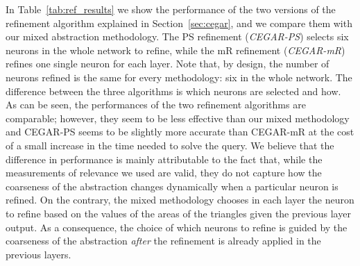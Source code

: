 In Table~\ref{tab:ref_results} we show the performance of the two versions of the
refinement algorithm explained in Section~\ref{sec:cegar}, and we compare them 
with our mixed abstraction methodology. The PS refinement (\textit{CEGAR-PS}) 
selects six neurons in the whole network to refine, while the mR refinement 
(\textit{CEGAR-mR}) refines one single neuron for each layer.
Note that, by design, the number of neurons refined is the same for every 
methodology: six in the whole network. The difference between the three algorithms 
is which neurons are selected and how. As can be seen, the performances of the 
two refinement algorithms are comparable; however, they seem to be less effective 
than our mixed methodology and CEGAR-PS seems to be slightly more accurate than 
CEGAR-mR at the cost of a small increase in the time needed to solve the query.
We believe that the difference in performance is mainly attributable to the fact 
that, while the measurements of relevance we used are valid, they do not capture how 
the coarseness of the abstraction changes dynamically when a particular neuron is 
refined. On the contrary, the mixed methodology chooses in each layer the neuron to 
refine based on the values of the areas of the triangles given the previous layer 
output. As a consequence, the choice of which neurons to refine is guided by the 
coarseness of the abstraction \emph{after} the refinement is already applied in the 
previous layers.